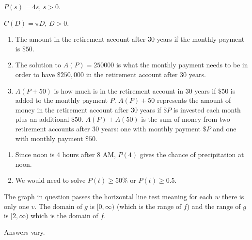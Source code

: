 \begin{tasks}[resume]
\task  $P(s) = 4s$, $s > 0$.

\task  $C(D) = \pi D$,  $D > 0$.

\task

\begin{enumerate}

\item The amount in the retirement account after 30 years if the monthly payment is $\$50$.

\item  The solution to $A(P) = 250000$ is what the monthly payment needs to be in order to have $\$250,\!000$ in the retirement account after 30 years.

\item  $A(P+50)$ is how much is in the retirement account in 30 years if $\$ 50$ is added to the monthly payment $P$.  $A(P)+50$ represents the amount of money in the retirement account after 30 years if $\$P$  is invested each month plus an additional $\$50$.  $A(P)+A(50)$ is the sum of money from two retirement accounts after 30 years: one with monthly payment $\$P$ and one with monthly payment $\$50$.

\end{enumerate}

\task  

\begin{enumerate}

\item  Since noon is $4$ hours after 8 AM, $P(4)$ gives the chance of precipitation at noon.

\item  We would need to solve $P(t) \geq 50 \%$ or $P(t) \geq 0.5$.

\end{enumerate}


\task The graph in question passes the horizontal line test meaning for each $w$ there is only one $v$.    The domain of $g$ is $[0, \infty)$ (which is the range of $f$) and the range of $g$ is $[2, \infty)$ which is the domain of $f$.  

\task  Answers vary.  

\end{tasks}

